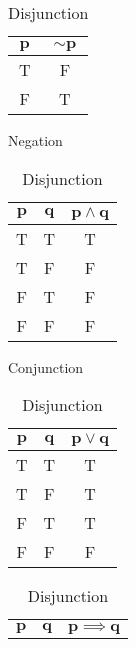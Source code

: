 \begin{defn}
\begin{table}[!htb]
   \centering
   \begin{minipage}{0.2\textwidth}
   \centering
      \begin{tabular}{|c|c|}
         \hline
         $\boldsymbol{p}$ &  $\boldsymbol{\sim p}$\\
         \hline
         T & F\\
         F & T\\
         \hline
      \end{tabular}
      \caption{\label{mod1:tab:Negation}Negation}
   \end{minipage}
   \begin{minipage}{0.38\textwidth}
      \centering
      \begin{tabular}{|c|c|c|}
            \hline
            $\boldsymbol{p}$ & $\boldsymbol{q}$ & $\boldsymbol{p \land q}$\\
            \hline
            T & T & T\\
            T & F & F\\
            F & T & F\\
            F & F & F\\
            \hline
      \end{tabular}
      \caption{\label{mod1:tab:Conjunction}Conjunction}
   \end{minipage}
   \vspace{1cm}
   \begin{minipage}{0.38\textwidth}
   \centering
            \begin{tabular}{|c|c|c|}
         \hline
         $\boldsymbol{p}$ & $\boldsymbol{q}$ & $\boldsymbol{p \lor q}$\\
         \hline
         T & T & T\\
         T & F & T\\
         F & T & T\\
         F & F & F\\
         \hline
      \end{tabular}
      \caption{\label{mod1:tab:Disjunction}Disjunction}
   \end{minipage}
   \hspace{6cm}
   \begin{minipage}{0.38\textwidth}
      \centering
      \begin{tabular}{|c|c|c|}
         \hline
         $\boldsymbol{p}$ & $\boldsymbol{q}$ & $\boldsymbol{p \implies q}$\\

\end{tabular}
\end{minipage}
\end{table}
\end{defn}
